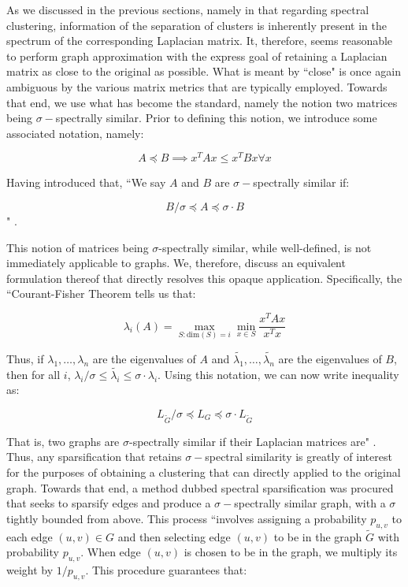 \documentclass[journal]{IEEEtran}
\begin{document}
As we discussed in the previous sections, namely in that regarding spectral clustering, information of the separation of clusters is inherently present in the spectrum of the corresponding Laplacian matrix. It, therefore, seems reasonable to perform graph approximation with the express goal of retaining a Laplacian matrix as close to the original as possible. What is meant by ``close" is once again ambiguous by the various matrix metrics that are typically employed. Towards that end, we use what has become the standard, namely the notion two matrices being $\sigma-$spectrally similar. Prior to defining this notion, we introduce some associated notation, namely:

$$ A \preceq B \implies x^T Ax \le x^T Bx \forall x $$

Having introduced that, ``We say $A$ and $B$ are $\sigma-$spectrally similar if:

$$ B / \sigma \preceq A \preceq \sigma\cdot B $$" \cite{spectral-sparse}.

This notion of matrices being $\sigma$-spectrally similar, while well-defined, is not immediately applicable to graphs. We, therefore, discuss an equivalent formulation thereof that directly resolves this opaque application. Specifically, the ``Courant-Fisher Theorem tells us that:

$$ \lambda_i(A) = \max_{S:\text{dim}(S)=i} \min_{x\in S} \frac{x^T Ax}{x^T x} $$

Thus, if $\lambda_1,\dots,\lambda_n$ are the eigenvalues of $A$ and $\widetilde{λ_1},\dots,\widetilde{\lambda_n}$ are the eigenvalues of $B$, then for all $i$, $\lambda_i / \sigma \le \widetilde{\lambda_i} \le \sigma\cdot\lambda_i$. Using this notation, we can now write inequality as:

$$ L_{\widetilde{G}} / \sigma \preceq L_{G} \preceq \sigma \cdot L_{\widetilde{G}}$$

That is, two graphs are $\sigma$-spectrally similar if their Laplacian matrices are" \cite{spectral-sparse}. Thus, any sparsification that retains $\sigma-$spectral similarity is greatly of interest for the purposes of obtaining a clustering that can directly applied to the original graph. Towards that end, a method dubbed spectral sparsification was procured that seeks to sparsify edges and produce a $\sigma-$spectrally similar graph, with a $\sigma$ tightly bounded from above. This process ``involves assigning a probability $p_{u,v}$ to each edge $(u, v)\in G$ and then selecting edge $(u, v)$ to be in the graph $\widetilde{G}$ with probability $p_{u,v}$. When edge $(u, v)$ is chosen to be in the graph, we multiply its weight by $1/p_{u,v}$. This procedure guarantees that:
\end{document}
